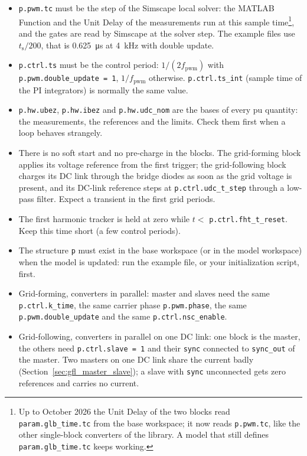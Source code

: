 \documentclass[11pt,a4paper]{scrartcl}
\newcommand{\ped}[1]{_{\mathrm{#1}}}
\newcommand{\code}[1]{\texttt{#1}}
\begin{document}
\begin{onehalfspace}
\begin{mybox}
\begin{itemize}[nosep]
	\item \code{p.pwm.tc} must be the step of the Simscape local solver: the MATLAB Function and the Unit Delay of the measurements run at this sample time\footnote{Up to October 2026 the Unit Delay of the two blocks read \code{param.glb\_time.tc} from the base workspace; it now reads \code{p.pwm.tc}, like the other single-block converters of the library. A model that still defines \code{param.glb\_time.tc} keeps working.}, and the gates are read by Simscape at the solver step. The example files use $t\ped{s}/200$, that is \SI{0.625}{\micro\second} at \SI{4}{\kilo\hertz} with double update.
	\item \code{p.ctrl.ts} must be the control period: $1/(2 f\ped{pwm})$ with \code{p.pwm.double\_update = 1}, $1/f\ped{pwm}$ otherwise. \code{p.ctrl.ts\_int} (sample time of the PI integrators) is normally the same value.
	\item \code{p.hw.ubez}, \code{p.hw.ibez} and \code{p.hw.udc\_nom} are the bases of every pu quantity: the measurements, the references and the limits. Check them first when a loop behaves strangely.
	\item There is no soft start and no pre-charge in the blocks. The grid-forming block applies its voltage reference from the first trigger; the grid-following block charges its DC link through the bridge diodes as soon as the grid voltage is present, and its DC-link reference steps at \code{p.ctrl.udc\_t\_step} through a low-pass filter. Expect a transient in the first grid periods.
	\item The first harmonic tracker is held at zero while $t <$ \code{p.ctrl.fht\_t\_reset}. Keep this time short (a few control periods).
	\item The structure \code{p} must exist in the base workspace (or in the model workspace) when the model is updated: run the example file, or your initialization script, first.
	\item Grid-forming, converters in parallel: master and slaves need the same \code{p.ctrl.k\_time}, the same carrier phase \code{p.pwm.phase}, the same \code{p.pwm.double\_update} and the same \code{p.ctrl.nsc\_enable}.
	\item Grid-following, converters in parallel on one DC link: one block is the master, the others need \code{p.ctrl.slave = 1} and their \code{sync} connected to \code{sync\_out} of the master. Two masters on one DC link share the current badly (Section~\ref{sec:gfl_master_slave}); a slave with \code{sync} unconnected gets zero references and carries no current.
\end{itemize}
\end{mybox}


\end{onehalfspace}
\end{document}
